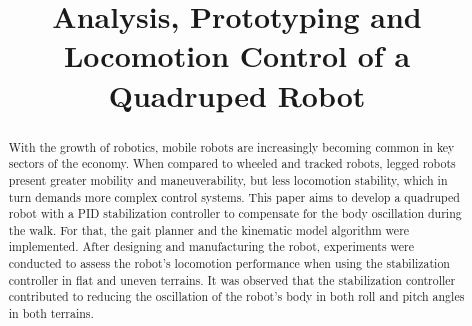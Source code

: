 \documentclass[conference]{IEEEtran}
\begin{document}
\title{Analysis, Prototyping and Locomotion Control of a Quadruped Robot\\
}

\author{
  \and
  \and
}

\maketitle

\begin{abstract}
  With the growth of robotics, mobile robots are increasingly becoming common in key sectors of the economy. When compared to wheeled and tracked robots, legged robots present greater mobility and maneuverability, but less locomotion stability, which in turn demands more complex control systems. This paper aims to develop a quadruped robot with a PID  stabilization controller to compensate for the body oscillation during the walk. For that, the gait planner and the kinematic model algorithm were implemented. After designing and manufacturing the robot, experiments were conducted to assess the robot's locomotion performance when using the stabilization controller in flat and uneven terrains. It was observed that the stabilization controller contributed to reducing the oscillation of the robot's body in both roll and pitch angles in both terrains.
\end{abstract}
\end{document}
